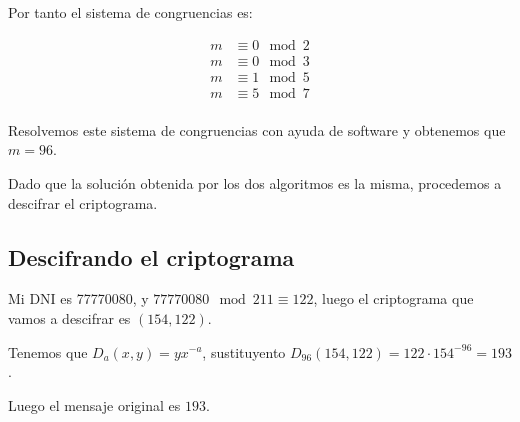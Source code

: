 \documentclass[a4paper]{article}
\begin{document}
Por tanto el sistema de congruencias es:

\begin{equation}
\begin{aligned}
m & \equiv 0 \mod 2 \\
m & \equiv 0 \mod 3 \\
m & \equiv 1 \mod 5 \\
m & \equiv 5 \mod 7 \\
\end{aligned}
\end{equation}

Resolvemos este sistema de congruencias con ayuda de software y obtenemos que $m=96$.

Dado que la solución obtenida por los dos algoritmos es la misma, procedemos a descifrar el criptograma.

\subsection{Descifrando el criptograma}

Mi DNI es 77770080, y $77770080 \mod 211 \equiv 122$, luego el criptograma que vamos a descifrar es $(154,122)$.

Tenemos que $D_{a}(x,y)=yx^{-a}$, sustituyento $D_{96}(154,122)=122 \cdot 154^{-96}=193$.

Luego el mensaje original es $193$.
\end{document}
